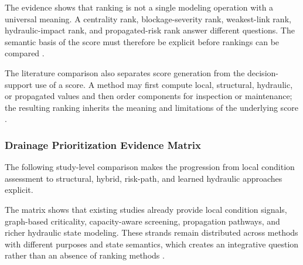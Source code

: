 The evidence shows that ranking is not a single modeling operation with
a universal meaning. A centrality rank, blockage-severity rank,
weakest-link rank, hydraulic-impact rank, and propagated-risk rank
answer different questions. The semantic basis of the score must
therefore be explicit before rankings can be compared
\citep{simone2022,dastgir2023,meijer2023,zhang2025}.






The literature comparison also separates score generation from the
decision-support use of a score. A method may first compute local,
structural, hydraulic, or propagated values and then order components for
inspection or maintenance; the resulting ranking inherits the meaning
and limitations of the underlying score \citep{simone2022,dastgir2023,
meijer2023,zhang2025}.

\subsubsection{Drainage Prioritization Evidence
Matrix}\label{drainage-prioritization-evidence-matrix}

The following study-level comparison makes the progression from local
condition assessment to structural, hybrid, risk-path, and learned
hydraulic approaches explicit.






The matrix shows that existing studies already provide local condition
signals, graph-based criticality, capacity-aware screening, propagation
pathways, and richer hydraulic state modeling. These strands remain
distributed across methods with different purposes and state semantics,
which creates an integrative question rather than an absence of ranking
methods \citep{iqbal2021,simone2022,dastgir2023,meijer2023,zhang2024,
zhang2025}.

